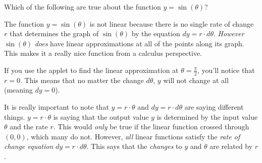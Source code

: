 \documentclass{ximera}
\begin{document}
\begin{question}
    \begin{prompt}
        Which of the following are true about the function $y=\sin(\theta)$?
    \begin{selectAll}
    \end{selectAll}
    \begin{feedback}
        The function $y=\sin(\theta)$ is not linear because there is no single rate of change $r$ that determines the graph of $\sin(\theta)$ by the equation $dy=r\cdot d\theta$. \emph{However} $\sin(\theta)$ \emph{does} have linear approximations at all of the points along its graph. This makes it a really nice function from a calculus perspective.
        
        If you use the applet to find the linear approximation at $\theta=\frac{\pi}{2}$, you'll notice that $r=0$. This means that no matter the change $d\theta$, $y$ will not change at all (meaning $dy=0$). 
        
        It is really important to note that $y=r\cdot \theta$ and $dy=r\cdot d\theta$ are saying different things. $y=r\cdot \theta$ is saying that the output value $y$ is determined by the input value $\theta$ and the rate $r$. This would \emph{only} be true if the linear function crossed through $(0,0)$, which many do not. However, \emph{all} linear functions satisfy the \emph{rate of change equation} $dy=r\cdot d\theta$. This says that the \emph{changes} to $y$ and $\theta$ are related by $r$. 
    \end{feedback}
    \end{prompt}
\end{question}
\end{document}
